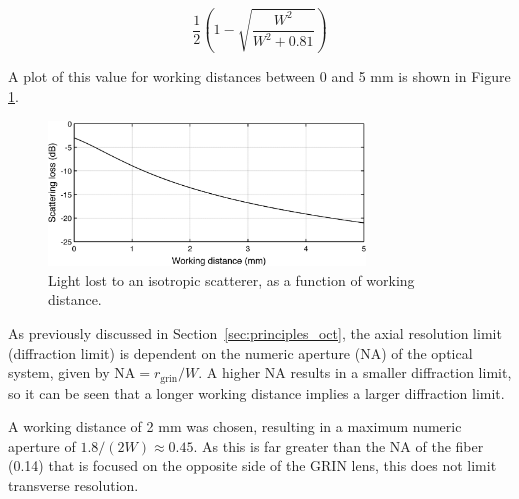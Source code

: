 \begin{equation}
\frac{1}{2} \left( 1 - \sqrt{\frac{W^2}{W^2 + 0.81}} \right)
\end{equation}

A plot of this value for working distances between 0 and 5 mm is shown in Figure \ref{fig:wd}.

\begin{figure}[h!]
\centering
\includegraphics[width=0.75\textwidth]{Images/System/grin_scattering2.png}
\caption[Light lost to an isotropic scatterer, as a function of working distance.]{Light lost to an isotropic scatterer, as a function of working distance. \label{fig:wd}}
\end{figure}

As previously discussed in Section~\ref{sec:principles_oct}, the axial resolution limit (diffraction limit) is dependent on the numeric aperture (NA) of the optical system, given by $\mathrm{NA} = r_{\mathrm{grin}}/W$. A higher NA results in a smaller diffraction limit, so it can be seen that a longer working distance implies a larger diffraction limit.



A working distance of 2 mm was chosen, resulting in a maximum numeric aperture of $1.8/(2W) \approx 0.45$. As this is far greater than the NA of the fiber (0.14) that is focused on the opposite side of the GRIN lens, this does not limit transverse resolution. %



